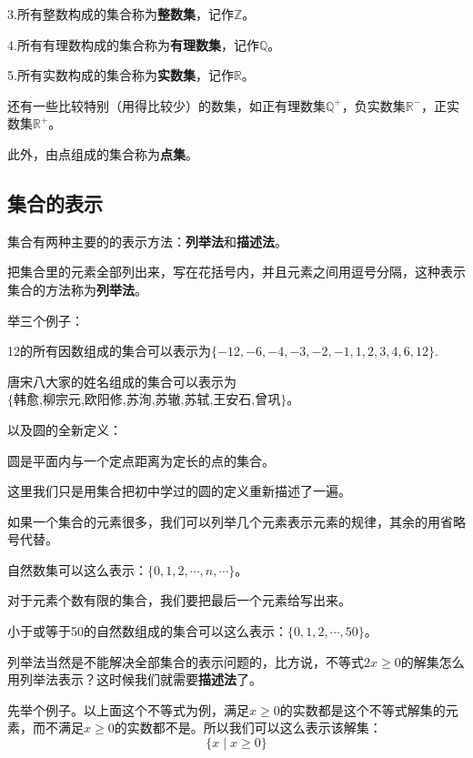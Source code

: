 \documentclass[lang=cn,math=cm,chinesefont=nofont,11pt,scheme=chinese,onecol]{elegantbook}
\begin{document}
3.所有整数构成的集合称为\textbf{整数集}，记作$\mathbb{Z}$。

4.所有有理数构成的集合称为\textbf{有理数集}，记作$\mathbb{Q}$。

5.所有实数构成的集合称为\textbf{实数集}，记作$\mathbb{R}$。

还有一些比较特别（用得比较少）的数集，如正有理数集$\mathbb{Q}^+$，负实数集$\mathbb{R}^-$，正实数集$\mathbb{R}^+$。

此外，由点组成的集合称为\textbf{点集}。

\subsection{集合的表示}
集合有两种主要的的表示方法：\textbf{列举法}和\textbf{描述法}。

把集合里的元素全部列出来，写在花括号内，并且元素之间用逗号分隔，这种表示集合的方法称为\textbf{列举法}。

举三个例子：

\begin{example}
  12的所有因数组成的集合可以表示为$\{-12,-6,-4,-3,-2,-1,1,2,3,4,6,12\}$.
\end{example}
\begin{example}
  唐宋八大家的姓名组成的集合可以表示为$\{\text{韩愈,柳宗元,欧阳修,苏洵,苏辙,苏轼,王安石,曾巩}\}$。
\end{example}
以及圆的全新定义：
\begin{definition}[圆]
  圆是平面内与一个定点距离为定长的点的集合。
\end{definition}
这里我们只是用集合把初中学过的圆的定义重新描述了一遍。

如果一个集合的元素很多，我们可以列举几个元素表示元素的规律，其余的用省略号代替。

\begin{example}
  自然数集可以这么表示：$\{0,1,2,\cdots,n,\cdots\}$。
\end{example}

对于元素个数有限的集合，我们要把最后一个元素给写出来。
\begin{example}
  小于或等于50的自然数组成的集合可以这么表示：$\{0,1,2,\cdots,50\}$。
\end{example}


列举法当然是不能解决全部集合的表示问题的，比方说，不等式$2x\geq 0$的解集怎么用列举法表示？这时候我们就需要\textbf{描述法}了。

先举个例子。以上面这个不等式为例，满足$x\geq 0$的实数都是这个不等式解集的元素，而不满足$x\geq 0$的实数都不是。所以我们可以这么表示该解集：
$$\{x\mid x\geq0\}$$
\end{document}
